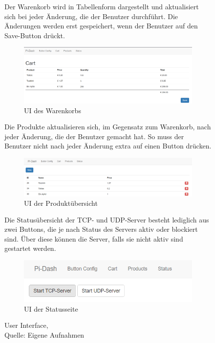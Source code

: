 \begin{figure}[!htb]
Der Warenkorb wird in Tabellenform dargestellt und aktualisiert sich bei jeder Änderung, die der Benutzer durchführt. Die Änderungen werden erst gespeichert, wenn der Benutzer auf den Save-Button drückt.	
  \begin{subfigure}{\linewidth}
	\centering
	\includegraphics[scale=0.4]{Bilder/ui_cart.png}
	\caption[UI des Warenkorbs]{\ac{UI} des Warenkorbs}
  \end{subfigure}\par\medskip
  
Die Produkte aktualisieren sich, im Gegensatz zum Warenkorb, nach jeder Änderung, die der Benutzer gemacht hat. So muss der Benutzer nicht nach jeder Änderung extra auf einen Button drücken.

  \begin{subfigure}{\linewidth}	
	\centering
	\includegraphics[scale=0.4]{Bilder/ui_products.png}
	\caption[UI der Produktübersicht]{\ac{UI} der Produktübersicht}
  \end{subfigure}\par\medskip
  
Die Statusübersicht der \ac{TCP}- und \ac{UDP}-Server besteht lediglich aus zwei Buttons, die je nach Status des Servers aktiv oder blockiert sind. Über diese können die Server, falls sie nicht aktiv sind gestartet werden.

  \begin{subfigure}{\linewidth}
	\centering
	\includegraphics[scale=0.8]{Bilder/ui_status.png}
	\caption[UI der Statusseite]{\ac{UI} der Statusseite}
  \end{subfigure}
  \caption[User Interface]{User Interface,\\ Quelle: Eigene Aufnahmen}
\end{figure}


